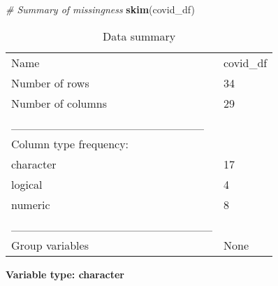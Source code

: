 \documentclass[
]{article}
\newenvironment{Shaded}{\begin{snugshade}}{\end{snugshade}}
\newcommand{\CommentTok}[1]{\textcolor[rgb]{0.56,0.35,0.01}{\textit{#1}}}
\newcommand{\FunctionTok}[1]{\textcolor[rgb]{0.13,0.29,0.53}{\textbf{#1}}}
\newcommand{\NormalTok}[1]{#1}
\begin{document}
\begin{Shaded}
\begin{Highlighting}[]
\CommentTok{\# Summary of missingness}
\FunctionTok{skim}\NormalTok{(covid\_df)}
\end{Highlighting}
\end{Shaded}

\begin{longtable}[]{@{}ll@{}}
\caption{Data summary}\tabularnewline
\toprule\noalign{}
\endfirsthead
\endhead
\bottomrule\noalign{}
\endlastfoot
Name & covid\_df \\
Number of rows & 34 \\
Number of columns & 29 \\
\_\_\_\_\_\_\_\_\_\_\_\_\_\_\_\_\_\_\_\_\_\_\_ & \\
Column type frequency: & \\
character & 17 \\
logical & 4 \\
numeric & 8 \\
\_\_\_\_\_\_\_\_\_\_\_\_\_\_\_\_\_\_\_\_\_\_\_\_ & \\
Group variables & None \\
\end{longtable}

\textbf{Variable type: character}
\end{document}
